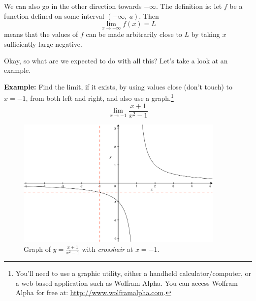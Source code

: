 \documentclass[12pt,addpoints, answers, fleqn]{exam}
\begin{document}
We can also go in the other direction towards $-\infty$. The definition is: let $f$ be a function defined on some interval $\left( -\infty, \ a \right)$. Then
\[
\mathop {\lim }\limits_{x \to -\infty }  f \left( x \right) = L
\]
means that the values of $f$ can be made arbitrarily close to $L$ by taking $x$ sufficiently large negative.




Okay, so what are we expected to do with all this? Let's take a look at an example.



\textbf{Example:} Find the limit, if it exists, by using values close (don't touch) to $x=-1$, from both left and right, and also use a graph.\footnote{You'll need to use a graphic utility, either a handheld calculator/computer, or a web-based application such as Wolfram Alpha. You can access Wolfram Alpha for free at: \url{http://www.wolframalpha.com}.}
\[
\mathop {\lim }\limits_{x \to -1 }  \frac{x+1}{x^2-1}
\]



\begin{figure}[htbp] %
   \centering
   \includegraphics[width=4in]{./graphics/graph020104.pdf} 
   \caption{Graph of $\displaystyle y =  \frac{x+1}{x^2-1}$ with \emph{crosshair} at $x=-1$.}
   \label{fig:graph020104}
\end{figure}
\end{document}
